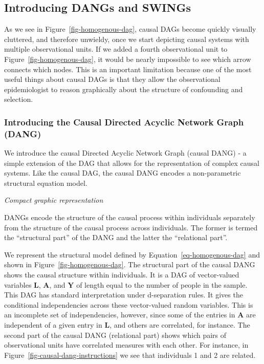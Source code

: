 \documentclass[
  letterpaper,
  DIV=11,
  numbers=noendperiod,
  oneside]{scrreprt}
\begin{document}
\hypertarget{introducing-dangs-and-swings}{%
\subsection*{Introducing DANGs and
SWINGs}\label{introducing-dangs-and-swings}}

As we see in Figure~\ref{fig-homogenous-dag}, causal DAGs become quickly
visually cluttered, and therefore unwieldy, once we start depicting
causal systems with multiple observational units. If we added a fourth
observational unit to Figure~\ref{fig-homogenous-dag}, it would be
nearly impossible to see which arrow connects which nodes. This is an
important limitation because one of the most useful things about causal
DAGs is that they allow the observational epidemiologist to reason
graphically about the structure of confounding and selection.

\hypertarget{introducing-the-causal-directed-acyclic-network-graph-dang}{%
\subsubsection{Introducing the Causal Directed Acyclic Network Graph
(DANG)}\label{introducing-the-causal-directed-acyclic-network-graph-dang}}

We introduce the causal Directed Acyclic Network Graph (causal DANG) - a
simple extension of the DAG that allows for the representation of
complex causal systems. Like the causal DAG, the causal DANG encodes a
non-parametric structural equation model.

\emph{Compact graphic representation}

DANGs encode the structure of the causal process within individuals
separately from the structure of the causal process across individuals.
The former is termed the ``structural part'' of the DANG and the latter
the ``relational part''.

We represent the structural model defined by
Equation~\ref{eq-homogenous-dag} and shown in
Figure~\ref{fig-homogenous-dag}. The structural part of the causal DANG
shows the causal structure within individuals. It is a DAG of
vector-valued variables \(\mathbf{L}\), \(\mathbf{A}\), and
\(\mathbf{Y}\) of length equal to the number of people in the sample.
This DAG has standard interpretation under d-separation rules. It gives
the conditional independencies across these vector-valued random
variables. This is an incomplete set of independencies, however, since
some of the entries in \(\mathbf{A}\) are independent of a given entry
in \(\mathbf{L}\), and others are correlated, for instance. The second
part of the causal DANG (relational part) shows which pairs of
observational units have correlated measures with each other. For
instance, in Figure~\ref{fig-causal-dang-instructions} we see that
individuals 1 and 2 are related.
\end{document}
